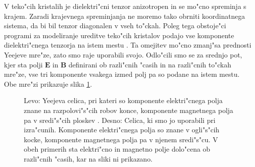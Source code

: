 \documentclass[12pt,twoside,openright,final]{report}
\renewcommand{\vec}{\mathbf}
\newcommand{\E}{\vec E}
\newcommand{\B}{\vec B}
\begin{document}
V teko"cih kristalih je dielektri"cni tenzor anizotropen in se mo"cno spreminja s krajem. 
Zaradi krajevnega spreminjanja ne moremo tako obrniti koordinatnega sistema, da bi bil tenzor diagonalen v vseh to"ckah. 
Poleg tega obstoje"ci programi za modeliranje ureditve teko"cih kristalov podajo vse komponente dielektri"cnega tenzorja na istem mestu \cite{ravnik-zumer-ldg}.
Ta omejitev mo"cno zmanj"sa prednosti Yeejeve mre"ze, zato smo raje uporabili svojo. 
Odlo"cili smo se za srednjo pot, kjer sta polji $\E$ in $\B$ definirani ob razli"cnih "casih in na razli"cnih to"ckah mre"ze, vse tri komponente vsakega izmed polj pa so podane na istem mestu. 
Obe mre"zi prikazuje slika \ref{fig:lattice}. 

\begin{figure}[h]
\centering
\caption{Levo: Yeejeva celica, pri kateri so komponente elektri"cnega polja znane na razpolovi"s"cih robov konce, komponente magnetnega polja pa v sredi"s"cih ploskev \cite{yee-lattice}. Desno: Celica, ki smo jo uporabili pri izra"cunih. Komponente elektri"cnega polja so znane v ogli"s"cih kocke, komponente magnetnega polja pa v njenem sredi"s"cu. V obeh primerih sta elektri"cno in magnetno polje dolo"cena ob razli"cnih "casih, kar na sliki ni prikazano.}
\label{fig:lattice}
\end{figure}
\end{document}
